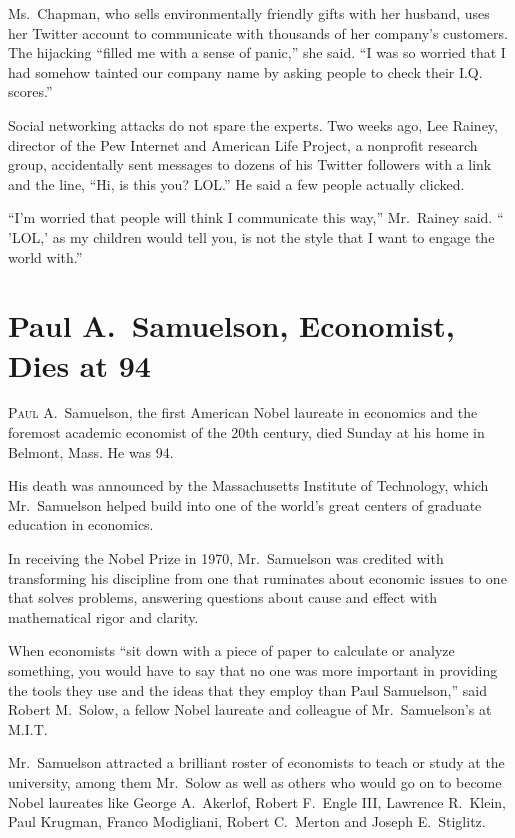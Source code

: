 ﻿\documentclass[12pt]{article}
\begin{document}
Ms.~Chapman, who sells environmentally friendly gifts with her husband, uses her Twitter account to
communicate with thousands of her company's customers. The hijacking ``filled me with a sense of
panic,'' she said. ``I was so worried that I had somehow tainted our company name by asking people
to check their I.Q. scores.''

Social networking attacks do not spare the experts. Two weeks ago, Lee Rainey, director of the Pew
Internet and American Life Project, a nonprofit research group, accidentally sent messages to dozens
of his Twitter followers with a link and the line, ``Hi, is this you? LOL.'' He said a few people
actually clicked.

``I'm worried that people will think I communicate this way,'' Mr.~Rainey said. `` 'LOL,' as my
children would tell you, is not the style that I want to engage the world with.''

\section{Paul A.~Samuelson, Economist, Dies at 94}

\lettrine{P}{aul} A.~Samuelson, the first American Nobel laureate in
economics and the foremost academic economist of the 20th century, died Sunday at his home in
Belmont, Mass. He was 94.

His death was announced by the Massachusetts Institute of Technology, which Mr.~Samuelson helped
build into one of the world's great centers of graduate education in economics.

In receiving the Nobel Prize in 1970, Mr.~Samuelson was credited with transforming his discipline
from one that ruminates about economic issues to one that solves problems, answering questions about
cause and effect with mathematical rigor and clarity.

When economists ``sit down with a piece of paper to calculate or analyze something, you would have
to say that no one was more important in providing the tools they use and the ideas that they employ
than Paul Samuelson,'' said Robert M.~Solow, a fellow Nobel laureate and colleague of
Mr.~Samuelson's at M.I.T.

Mr.~Samuelson attracted a brilliant roster of economists to teach or study at the university, among
them Mr.~Solow as well as others who would go on to become Nobel laureates like George A.~Akerlof,
Robert F.~Engle III, Lawrence R.~Klein, Paul Krugman, Franco Modigliani, Robert C.~Merton and Joseph
E.~Stiglitz.
\end{document}
